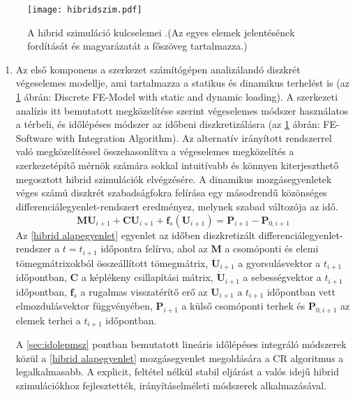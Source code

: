 \begin{figure}[h!]
\centering
\texttt{[image: hibridszim.pdf]}
\caption[A hibrid szimuláció kulcselemei \cite{hibrid}]{A hibrid szimuláció kulcselemei \cite{hibrid}.(Az egyes elemek jelentésének fordítását és magyarázatát a főszöveg tartalmazza.)}
\label{fig:hibridszim}
\end{figure}

\begin{enumerate}
\item Az első komponens  a szerkezet számítógépen analizálandó diszkrét végeselemes modellje, ami tartalmazza a statikus és dinamikus terhelést is (az \ref{fig:hibridszim} ábrán: Discrete FE-Model with static and dynamic loading).  A szerkezeti analízis itt bemutatott megközelítése szerint végeselemes módszer használatos a térbeli, és  időlépéses módszer az időbeni diszkretizálásra (az \ref{fig:hibridszim} ábrán: FE-Software with Integration Algorithm). Az alternatív irányított rendszerrel való megközelítéssel összehasonlítva a végeselemes megközelítés a szerkezetépítő mérnök számára sokkal intuitívabb és könnyen kiterjeszthető megosztott hibrid szimulációk elvégzésére. A dinamikus mozgásegyenletek véges számú diszkrét szabadságfokra felírása  egy másodrendű közönséges differenciálegyenlet-rendszert eredményez, melynek szabad változója az idő.
\begin{equation}
\mathbf{M}\mathbf{\ddot{U}}_{i+1}+\mathbf{C}\mathbf{\dot{U}}_{i+1}+\mathbf{f}_s(\mathbf{U}_{i+1}) = \mathbf{P}_{i+1}-\mathbf{P}_{0,i+1}
\label{hibrid alapegyenlet}
\end{equation}
Az \eqref{hibrid alapegyenlet} egyenlet az időben diszkretizált differenciálegyenlet-rendszer a $t = t_{i+1}$ időpontra felírva, ahol az $\mathbf{M}$ a csomóponti és elemi tömegmátrixokból összeállított tömegmátrix, $\mathbf{\ddot{U}}_{i+1}$ a gyorsulásvektor a $t_{i+1}$ időpontban, $\mathbf{C}$ a képlékeny csillapítási mátrix, $\mathbf{\dot{U}}_{i+1}$ a sebességvektor a $t_{i+1}$ időpontban, $\mathbf{f}_s$ a rugalmas visszatérítő erő  az $\mathbf{U}_{i+1}$ a $t_{i+1}$ időpontban vett elmozdulásvektor függvényében, $\mathbf{P}_{i+1}$ a külső csomóponti terhek  és $\mathbf{P}_{0,i+1}$ az elemek terhei a $t_{i+1}$ időpontban.

A \ref{sec:idolepmsz} pontban bemutatott lineáris időlépéses integráló módszerek közül a \eqref{hibrid alapegyenlet} mozgásegyenlet megoldására a CR algoritmus a legalkalmasabb. A explicit, feltétel nélkül stabil eljárást a valós idejű hibrid szimulációkhoz fejlesztették, irányításelméleti módszerek alkalmazásával. 


\end{enumerate}
